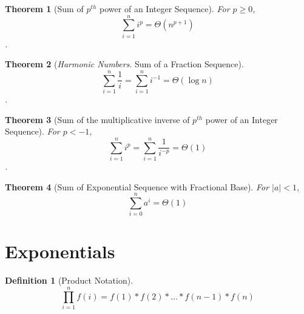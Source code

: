 \documentclass[]{tufte-handout}
\newtheorem{theorem}{Theorem}
\newtheorem{definition}{Definition}
\begin{document}
\begin{theorem}[Sum of $p^{th}$ power of an Integer Sequence]
\leavevmode\newline{}
For $p \geq 0$, \[\sum\limits_{i=1}^{n} i^p = \Theta(n^{p+1})\].
\end{theorem}

\begin{theorem}[\textit{Harmonic Numbers}. Sum of a Fraction Sequence]
\leavevmode\newline{}
\[\sum\limits_{i=1}^{n} \frac{1}{i} = \sum\limits_{i=1}^{n} i^{-1} = \Theta(\log n)\].
\end{theorem}



\begin{theorem}[Sum of the multiplicative inverse of $p^{th}$ power of an Integer Sequence]
 \leavevmode\newline{}
For $p < -1$, \[\sum\limits_{i=1}^{n} i^p = \sum\limits_{i=1}^{n} \frac{1}{i^{-p}} = \Theta(1)\].
\end{theorem}



\begin{theorem}[Sum of Exponential Sequence with Fractional Base]
\leavevmode\newline{}For $|a| < 1$, \[\sum\limits_{i=0}^{n} a^i = \Theta(1)\]
\end{theorem}




\newpage

\section{Exponentials}

\begin{definition}[Product Notation]
\leavevmode\newline{}
\[\prod\limits_{i=1}^{n} f(i) = f(1)*f(2)*\ldots*f(n-1)*f(n)\]
\end{definition}
\end{document}
